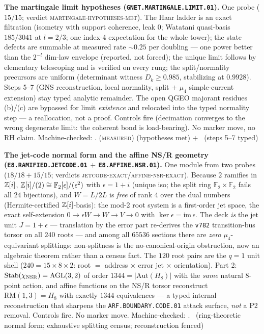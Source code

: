 \par\smallskip\noindent\textbf{The martingale limit hypotheses
(\texttt{GNET.MARTINGALE.LIMIT.01}).}
One probe ($15/15$; verdict \textsc{martingale-hypotheses-met}).
The Haar ladder is an exact filtration (isometry with support
coherence, leak $0$; Watatani quasi-basis $185/3041$ at $l=2/3$;
one index-4 expectation for the whole tower); the state defects are
summable at measured rate ${\sim}0.25$ per doubling --- one power
better than the $2^{-l}$ dim-law envelope (reported, not forced);
the unique limit follows by elementary telescoping and is verified
on every rung; the split/normality precursors are uniform
(determinant witness $D_k\ge0.985$, stabilizing at $0.9928$).
Steps 5--7 (GNS reconstruction, local normality, split $+$ $\mu_4$
simple-current extension) stay typed analytic remainder.  The open
QGEO majorant residues (b)/(c) are bypassed for limit
\emph{existence} and relocated into the typed normality step --- a
reallocation, not a proof.  Controls fire (decimation converges to
the wrong degenerate limit: the coherent bond is load-bearing).  No
marker move, no RH claim.
Machine-checked: .
(\textsc{measured}) (hypotheses met) $+$ \mO\ (steps 5--7 typed)
\par\smallskip

\par\smallskip\noindent\textbf{The jet-code normal form and the
affine NS/R geometry (\texttt{E8.RAMIFIED.JETCODE.01} $+$
\texttt{E8.AFFINE.NSR.01}).}
One module from two probes ($18/18+15/15$; verdicts
\textsc{jetcode-exact}/\textsc{affine-nsr-exact}).  Because $2$
ramifies in $\mathbb{Z}[i]$, $\mathbb{Z}[i]/(2)\cong\mathbb F_2[\epsilon]/(\epsilon^2)$
with $\epsilon=1{+}i$ (unique iso; the split ring
$\mathbb F_2\times\mathbb F_2$ fails all $24$ bijections), and
$W=L/2L$ is \emph{free} of rank $4$ over the dual numbers
(Hermite-certified $\mathbb{Z}[i]$-basis): the mod-2 root system is a
first-order jet space, the exact self-extension
$0\to\epsilon W\to W\to V\to0$ with
$\ker\epsilon=\mathrm{im}\,\epsilon$.  The deck \emph{is} the jet
unit $J=1{+}\epsilon$ --- translation by the error part re-derives
the \texttt{v782} transition-bus torsor on all $240$ roots --- and
among all $65536$ sections there are \emph{zero} $\mu_4$-equivariant
splittings: non-splitness is the no-canonical-origin obstruction,
now an algebraic theorem rather than a census fact.  The $120$ root
pairs are the $q{=}1$ unit shell ($240=15\times8\times2$: root $=$
address $\times$ error jet $\times$ orientation).  Part 2:
$\mathrm{Stab}(\chi_{\rm NSR})=\mathrm{AGL}(3,2)$ of order
$1344=|\mathrm{Aut}(H_8)|$ with the \emph{same} natural 8-point action, and
affine functions on the NS/R torsor reconstruct
$\mathrm{RM}(1,3)=H_8$ with exactly $1344$ equivalences --- a typed
internal reconstruction that sharpens the
\texttt{ARF.BOUNDARY.CODE.01} attack surface, \emph{not} a P2
removal.  Controls fire.  No marker move.
Machine-checked: .
\mE\ (ring-theoretic normal form; exhaustive splitting census;
reconstruction fenced)
\par\smallskip

